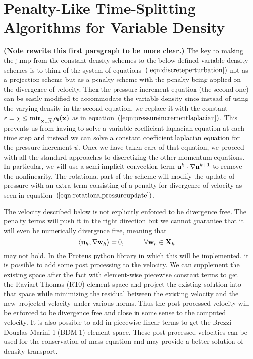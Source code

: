 \documentclass[letterpaper]{erdc}
\begin{document}
%
%
%
\section{Penalty-Like Time-Splitting Algorithms for Variable Density}\label{sec:variabledensityAlgorithm}
\textbf{(Note rewrite this first paragraph to be more clear.)} The key to making the jump from the constant density schemes to the below defined variable density schemes is to think of the system of equations~$\left(\ref{eqn:discreteperturbation}\right)$ not as a projection scheme but as a penalty scheme with the penalty being applied on the divergence of velocity.  Then the pressure increment equation (the second one) can be easily modified to accommodate the variable density since instead of using the varying density in the second equation, we replace it with the constant $\varepsilon = \chi \leq \min_{\textbf{x}\in\overline{\Lambda}}\rho_0(\textbf{x})$ as in equation~$\left(\ref{eqn:pressureincrementlaplacian}\right)$.  This prevents us from having to solve a variable coefficient laplacian equation at each time step and instead we can solve a constant coefficient laplacian equation for the pressure increment $\psi$.  Once we have taken care of that equation, we proceed with all the standard approaches to discretizing the other momentum equations.  In particular, we will use a semi-implicit convection term $\textbf{u}^{k}\cdot\nabla\textbf{u}^{k+1}$ to remove the nonlinearity.  The rotational part of the scheme will modify the update of pressure with an extra term consisting of a penalty for divergence of velocity as seen in equation~$\left(\ref{eqn:rotationalpressureupdate}\right)$.  

The velocity described below is not explicitly enforced to be divergence free.  The penalty terms will push it in the right direction but we cannot guarantee that it will even be numerically divergence free, meaning that 
\begin{equation}
  \left\langle \textbf{u}_h, \nabla\textbf{w}_h \right\rangle = 0, \hspace{1cm}\forall\textbf{w}_h\in\textbf{X}_h
\end{equation}
may not hold.  In the Proteus python library in which this will be implemented, it is possible to add some post processing to the velocity.  We can supplement the existing space after the fact with element-wise piecewise constant terms to get the Raviart-Thomas (RT0) element space and project the existing solution into that space while minimizing the residual between the existing velocity and the new projected velocity under various norms.    Thus the post processed velocity will be enforced to be divergence free and close in some sense to the computed velocity.  It is also possible to add in piecewise linear terms to get the Brezzi-Douglas-Marini-1 (BDM-1) element space.  These post processed velocities can be used for the conservation of mass equation and may provide a better solution of density transport.
\end{document}
